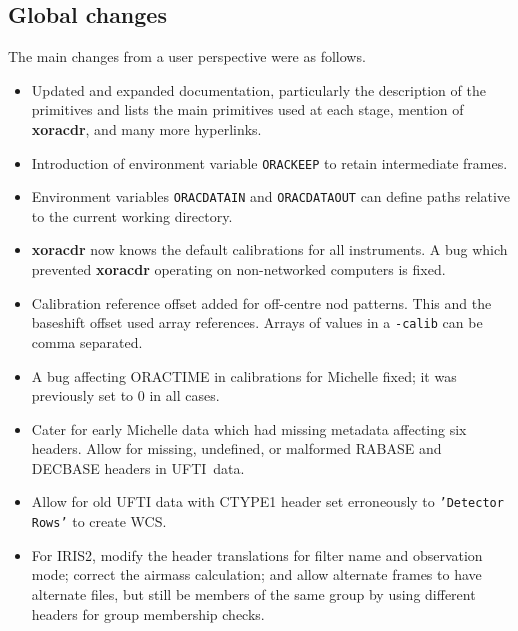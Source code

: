 \documentclass[twoside,11pt]{article}
\newcommand{\htmladdnormallink}[2]{#1}
\newcommand{\htmlref}[2]{#1}
\newcommand{\xref}[3]{#1}
\renewcommand{\_}{\texttt{\symbol{95}}}
\newcommand{\IRIS}{\htmladdnormallink{IRIS2}{http://www.aao.gov.au/iris2/}}
\newcommand{\UFTI}{\htmladdnormallink{UFTI}{http://www.jach.hawaii.edu/JACpublic/UKIRT/instruments/ufti/ufti.html}}
\begin{document}
\subsection{Global changes}

The main changes from a user perspective were as follows.

\begin{itemize}
   \item Updated and expanded documentation, particularly the 
   \htmlref{description of the primitives}{features_of_the_primitives}
   and lists the main primitives used at each stage, mention of
   \xref{{\bf xoracdr}}{sun230}{xoracdr}, and many more hyperlinks.

   \item Introduction of environment variable {\tt ORAC\_KEEP} to retain
   intermediate frames.

   \item Environment variables {\tt ORAC\_DATA\_IN} and {\tt ORAC\_DATA\_OUT}
   can define paths relative to the current working directory.

   \item {\bf xoracdr} now knows the default calibrations for all
   instruments.  A bug which prevented {\bf xoracdr} operating on
   non-networked computers is fixed.

   \item Calibration reference offset added for off-centre nod patterns.
   This and the baseshift offset used array references.  Arrays of
   values in a {\tt -calib} can be comma separated.
   
   \item A bug affecting ORACTIME in calibrations for Michelle fixed;
   it was previously set to 0 in all cases.

   \item Cater for early Michelle data which had missing metadata
   affecting six headers.  Allow for missing, undefined, or malformed
   RA\_BASE and DEC\_BASE headers in \UFTI\ data.

   \item Allow for old UFTI data with CTYPE1 header set erroneously to 
   {\tt 'Detector Rows'} to create WCS.
   
   \item For \IRIS, modify the header translations for filter name 
   and observation mode; correct the airmass calculation; and allow
   alternate frames to have alternate files, but still be members of the
   same group by using different headers for group membership checks.


\end{itemize}
\end{document}
